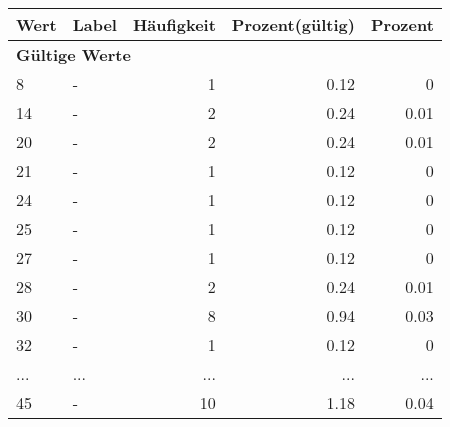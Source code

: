      \begin{longtable}{lXrrr}
     \toprule
     \textbf{Wert} & \textbf{Label} & \textbf{Häufigkeit} & \textbf{Prozent(gültig)} & \textbf{Prozent} \\
     \endhead
     \midrule
     \multicolumn{5}{l}{\textbf{Gültige Werte}}\\
        8 & \multicolumn{1}{X}{-} & %
          \num{1} &
          \num[round-mode=places,round-precision=2]{0.12} &
          \num[round-mode=places,round-precision=2]{0} \\
        14 & \multicolumn{1}{X}{-} & %
          \num{2} &
          \num[round-mode=places,round-precision=2]{0.24} &
          \num[round-mode=places,round-precision=2]{0.01} \\
        20 & \multicolumn{1}{X}{-} & %
          \num{2} &
          \num[round-mode=places,round-precision=2]{0.24} &
          \num[round-mode=places,round-precision=2]{0.01} \\
        21 & \multicolumn{1}{X}{-} & %
          \num{1} &
          \num[round-mode=places,round-precision=2]{0.12} &
          \num[round-mode=places,round-precision=2]{0} \\
        24 & \multicolumn{1}{X}{-} & %
          \num{1} &
          \num[round-mode=places,round-precision=2]{0.12} &
          \num[round-mode=places,round-precision=2]{0} \\
        25 & \multicolumn{1}{X}{-} & %
          \num{1} &
          \num[round-mode=places,round-precision=2]{0.12} &
          \num[round-mode=places,round-precision=2]{0} \\
        27 & \multicolumn{1}{X}{-} & %
          \num{1} &
          \num[round-mode=places,round-precision=2]{0.12} &
          \num[round-mode=places,round-precision=2]{0} \\
        28 & \multicolumn{1}{X}{-} & %
          \num{2} &
          \num[round-mode=places,round-precision=2]{0.24} &
          \num[round-mode=places,round-precision=2]{0.01} \\
        30 & \multicolumn{1}{X}{-} & %
          \num{8} &
          \num[round-mode=places,round-precision=2]{0.94} &
          \num[round-mode=places,round-precision=2]{0.03} \\
        32 & \multicolumn{1}{X}{-} & %
          \num{1} &
          \num[round-mode=places,round-precision=2]{0.12} &
          \num[round-mode=places,round-precision=2]{0} \\
       ... & ... & ... & ... & ... \\
        45 & \multicolumn{1}{X}{-} & %
          \num{10} &
          \num[round-mode=places,round-precision=2]{1.18} &
          \num[round-mode=places,round-precision=2]{0.04} \\


\end{longtable}
